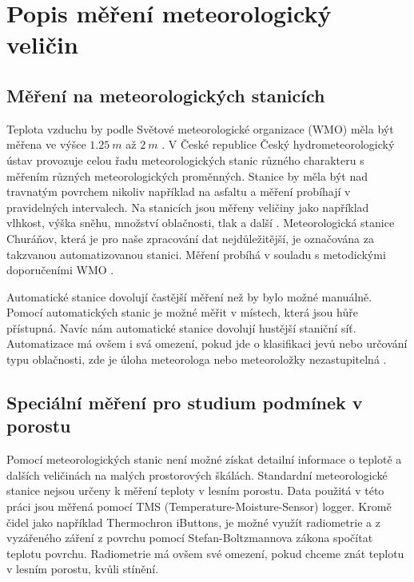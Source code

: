 \section{Popis měření meteorologický veličin} \label{chap:measure}
\subsection{Měření na meteorologických stanicích}\label{chap:meteostations}
Teplota vzduchu by podle Světové meteorologické organizace (WMO) měla být měřena ve výšce $\SI{1.25}{m}$ až $\SI{2}{m}$ \parencite{wmo2021}. V České republice Český hydrometeorologický ústav provozuje celou řadu meteorologických stanic různého charakteru s měřením různých meteorologických proměnných. Stanice by měla být nad travnatým povrchem nikoliv například na asfaltu a měření probíhají v pravidelných intervalech. Na stanicích jsou měřeny veličiny jako například vlhkost, výška sněhu, množství oblačnosti, tlak a další \parencite{chmustanice}. Meteorologická stanice Churáňov, která je pro naše zpracování dat nejdůležitější, je označována za takzvanou automatizovanou stanici. Měření probíhá v souladu s metodickými doporučeními WMO \parencite{chmustanice2}.

Automatické stanice dovolují častější měření než by bylo možné manuálně. Pomocí automatických stanic je možné měřit v místech, která jsou hůře přístupná. Navíc nám automatické stanice dovolují hustější staniční síť. Automatizace má ovšem i svá omezení, pokud jde o klasifikaci jevů nebo určování typu oblačnosti, zde je úloha meteorologa nebo meteoroložky nezastupitelná \parencite{automatisation}.

\subsection{Speciální měření pro studium podmínek v porostu}
Pomocí meteorologických stanic není možné získat detailní informace o teplotě a dalších veličinách na malých prostorových škálách. Standardní meteorologické stanice nejsou určeny k měření teploty v lesním porostu. Data použitá v této práci jsou měřená pomocí TMS (Temperature-Moisture-Sensor) logger. Kromě čidel jako například Thermochron iButtons, je možné využít radiometrie a z vyzářeného záření z povrchu pomocí Stefan-Boltzmannova zákona spočítat teplotu povrchu. Radiometrie má ovšem své omezení, pokud chceme znát teplotu v lesním porostu, kvůli stínění. 

